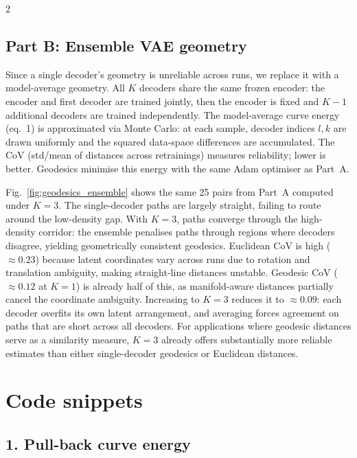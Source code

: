 \documentclass[10pt,a4paper]{article}
\begin{document}
\begin{multicols}{2}
    \subsection*{Part B: Ensemble VAE geometry}

    Since a single decoder's geometry is unreliable across runs, we
    replace it with a model-average geometry. All $K$ decoders share
    the same frozen encoder: the encoder and first decoder are trained
    jointly, then the encoder is fixed and $K\!-\!1$ additional decoders
    are trained independently. The model-average curve energy (eq.~1)
    is approximated via Monte Carlo: at each sample, decoder indices
    $l,k$ are drawn uniformly and the squared data-space differences
    are accumulated. The CoV (std/mean of distances across retrainings)
    measures reliability; lower is better. Geodesics minimise this
    energy with the same Adam optimiser as Part~A.

    Fig.~\ref{fig:geodesics_ensemble} shows the same 25 pairs from
    Part~A computed under $K\!=\!3$. The single-decoder paths are
    largely straight, failing to route around the low-density gap.
    With $K\!=\!3$, paths converge through the high-density corridor:
    the ensemble penalises paths through regions where decoders disagree,
    yielding geometrically consistent geodesics.
    Euclidean CoV is high (${\approx}0.23$) because latent coordinates
    vary across runs due to rotation and translation ambiguity, making
    straight-line distances unstable. Geodesic CoV (${\approx}0.12$ at
    $K\!=\!1$) is already half of this, as manifold-aware distances
    partially cancel the coordinate ambiguity. Increasing to $K\!=\!3$
    reduces it to ${\approx}0.09$: each decoder overfits its own latent
    arrangement, and averaging forces agreement on paths that are short
    across all decoders. For applications where geodesic distances
    serve as a similarity measure, $K\!=\!3$ already offers
    substantially more reliable estimates than either single-decoder
    geodesics or Euclidean distances.

\end{multicols}

\newpage


\section*{Code snippets}

\subsection*{1. Pull-back curve energy}
\end{document}

